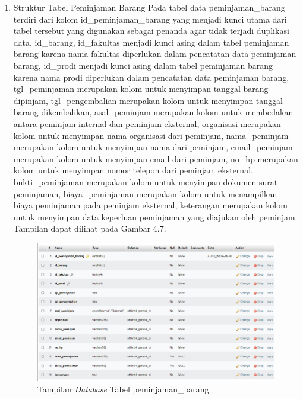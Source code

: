 \begin{enumerate}
  \item Struktur Tabel Peminjaman Barang
        Pada tabel data peminjaman\_barang terdiri dari kolom id\_peminjaman\_barang yang menjadi kunci utama dari tabel tersebut yang digunakan sebagai penanda agar tidak terjadi duplikasi data, id\_barang, id\_fakultas menjadi kunci asing dalam tabel peminjaman barang karena nama fakultas diperlukan dalam pencatatan data peminjaman barang, id\_prodi menjadi kunci asing dalam tabel peminjaman barang karena nama prodi diperlukan dalam pencatatan data peminjaman barang, tgl\_peminjaman merupakan kolom untuk menyimpan tanggal barang dipinjam, tgl\_pengembalian merupakan kolom untuk menyimpan tanggal barang dikembalikan, asal\_peminjam merupakan kolom untuk membedakan antara peminjam internal dan peminjam eksternal, organisasi merupakan kolom untuk menyimpan nama organisasi dari peminjam, nama\_peminjam merupakan kolom untuk menyimpan nama dari peminjam, email\_peminjam merupakan kolom untuk menyimpan email dari peminjam, no\_hp merupakan kolom untuk menyimpan nomor telepon dari peminjam eksternal, bukti\_peminjaman merupakan kolom untuk menyimpan dokumen surat peminjaman, biaya\_peminjaman merupakan kolom untuk menampilkan biaya peminjaman pada peminjam eksternal, keterangan merupakan kolom untuk menyimpan data keperluan peminjaman yang diajukan oleh peminjam. Tampilan dapat dilihat pada Gambar 4.7.

        \begin{figure}
          \centering
          \includegraphics[width=0.82\linewidth]{konten//gambar/Tampilan database tabel peminjaman_barang.png}
          \caption{Tampilan \textit{Database} Tabel peminjaman\_barang}
          \label{fig:enter-label}
        \end{figure}


\end{enumerate}
